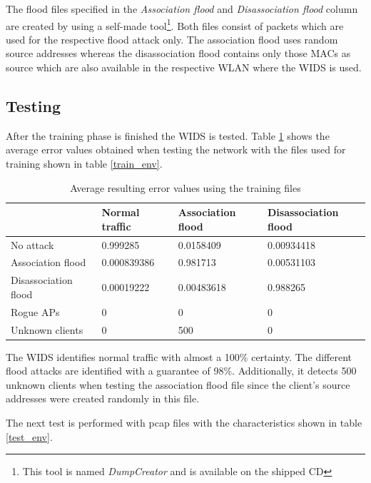 The flood files specified in the {\em Association flood} and {\em Disassociation flood} column are created by using a self-made tool\footnote{This tool is named {\em DumpCreator} and is available on the shipped CD}. Both files consist of packets which are used for the respective flood attack only. The association flood uses random source addresses whereas the disassociation flood contains only those MACs as source which are also available in the respective WLAN where the WIDS is used.

\subsection{Testing}

After the training phase is finished the WIDS is tested. Table \ref{result_train} shows the average error values obtained when testing the network with the files used for training shown in table \ref{train_env}.

\begin{table}[htbp]
	\vspace{1.5em}
	\begin{center}
		\begin{tabular}{|l|p{60pt}|p{60pt}|p{75pt}|}
		\hline
		&\bf{Normal traffic}&\bf{Association flood}&\bf{Disassociation flood} \\
		\hline
		No attack&0.999285&0.0158409&0.00934418\\
		\hline
		Association flood&0.000839386&0.981713&0.00531103\\
		\hline
		Disassociation flood&0.00019222&0.00483618&0.988265\\
		\hline
		\hline
		Rogue APs&0&0&0\\
		\hline
		Unknown clients&0&500&0\\
		\hline
		\end{tabular}
	\end{center}
	\vspace{-1em}
	\caption{Average resulting error values using the training files}
	\vspace{1em}
	\label{result_train}
\end{table}

The WIDS identifies normal traffic with almost a 100\% certainty. The different flood attacks are identified with a guarantee of 98\%. Additionally, it detects 500 unknown clients when testing the association flood file since the client's source addresses were created randomly in this file.

The next test is performed with pcap files with the characteristics shown in table \ref{test_env}.

